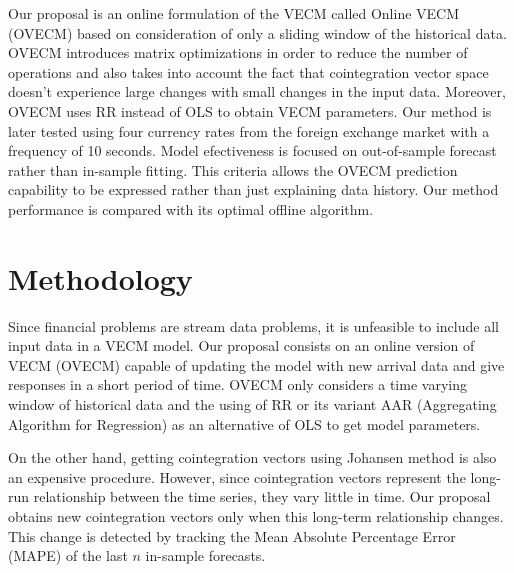 Our proposal is an online formulation of the VECM called Online VECM (OVECM)
based on consideration of only a sliding window of the historical data.  OVECM
introduces matrix optimizations in order to reduce the number of operations and
also takes into account the fact that cointegration vector space doesn't
experience large changes with small changes in the input data. Moreover, OVECM
uses RR instead of OLS to obtain VECM parameters. Our method is later tested using four
currency rates from the foreign exchange market with a frequency of 10 seconds.
Model efectiveness is focused on out-of-sample forecast rather than in-sample
fitting.  This criteria allows the OVECM prediction capability to be expressed
rather than just explaining data history. Our method performance is compared
with its optimal offline algorithm.




\section{Methodology}

Since financial problems are stream data problems, it is unfeasible to include
all input data in a VECM model. Our proposal consists on an online version of
VECM (OVECM) capable of updating the model with new arrival data and give
responses in a short period of time. OVECM only considers a time varying window
of historical data and the using of RR or its variant AAR (Aggregating Algorithm
for Regression) as an alternative of OLS to get model parameters.

On the other hand, getting cointegration vectors using Johansen method is also
an expensive procedure. However, since cointegration
vectors represent the long-run relationship between the time series, they
vary little in time. Our proposal obtains new cointegration vectors only when
this long-term relationship changes. This change is detected by tracking 
the Mean Absolute Percentage Error (MAPE) of the last $n$ in-sample forecasts.

% 
%




